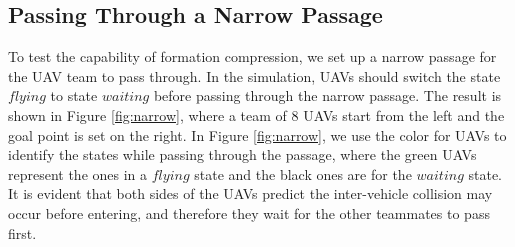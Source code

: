 \subsection{Passing Through a Narrow Passage}
To test the capability of formation compression, we set up a narrow passage for the UAV team to pass through. In the simulation, UAVs should switch the state $flying$ to state $waiting$ before passing through the narrow passage. The result is shown in Figure \ref{fig:narrow}, where a team of 8 UAVs start from the left and the goal point is set on the right. In Figure \ref{fig:narrow}, we use the color for UAVs to identify the states while passing through the passage, where the green UAVs represent the ones in a $flying$ state and the black ones are for the $waiting$ state. It is evident that both sides of the UAVs predict the inter-vehicle collision may occur before entering, and therefore they wait for the other teammates to pass first.


